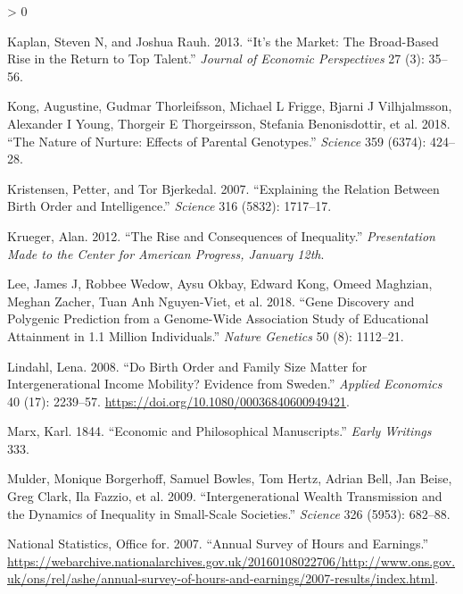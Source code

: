 \documentclass[
]{article}
\newlength{\cslhangindent}
\newenvironment{CSLReferences}[2] %
 {%
  \setlength{\parindent}{0pt}
  \ifodd #1 \everypar{\setlength{\hangindent}{\cslhangindent}}\ignorespaces\fi
  \ifnum #2 > 0
  \setlength{\parskip}{#2\baselineskip}
  \fi
 }%
 {}
\begin{document}
\begin{CSLReferences}{1}{0}
\leavevmode\hypertarget{ref-kaplan2013s}{}%
Kaplan, Steven N, and Joshua Rauh. 2013. {``It's the Market: The Broad-Based Rise in the Return to Top Talent.''} \emph{Journal of Economic Perspectives} 27 (3): 35--56.

\leavevmode\hypertarget{ref-kong2018nature}{}%
Kong, Augustine, Gudmar Thorleifsson, Michael L Frigge, Bjarni J Vilhjalmsson, Alexander I Young, Thorgeir E Thorgeirsson, Stefania Benonisdottir, et al. 2018. {``The Nature of Nurture: Effects of Parental Genotypes.''} \emph{Science} 359 (6374): 424--28.

\leavevmode\hypertarget{ref-kristensen2007explaining}{}%
Kristensen, Petter, and Tor Bjerkedal. 2007. {``Explaining the Relation Between Birth Order and Intelligence.''} \emph{Science} 316 (5832): 1717--17.

\leavevmode\hypertarget{ref-krueger2012rise}{}%
Krueger, Alan. 2012. {``The Rise and Consequences of Inequality.''} \emph{Presentation Made to the Center for American Progress, January 12th}.

\leavevmode\hypertarget{ref-lee2018gene}{}%
Lee, James J, Robbee Wedow, Aysu Okbay, Edward Kong, Omeed Maghzian, Meghan Zacher, Tuan Anh Nguyen-Viet, et al. 2018. {``Gene Discovery and Polygenic Prediction from a Genome-Wide Association Study of Educational Attainment in 1.1 Million Individuals.''} \emph{Nature Genetics} 50 (8): 1112--21.

\leavevmode\hypertarget{ref-Lindahl_2008}{}%
Lindahl, Lena. 2008. {``Do Birth Order and Family Size Matter for Intergenerational Income Mobility? Evidence from Sweden.''} \emph{Applied Economics} 40 (17): 2239--57. \url{https://doi.org/10.1080/00036840600949421}.

\leavevmode\hypertarget{ref-marx1844economic}{}%
Marx, Karl. 1844. {``Economic and Philosophical Manuscripts.''} \emph{Early Writings} 333.

\leavevmode\hypertarget{ref-mulder2009intergenerational}{}%
Mulder, Monique Borgerhoff, Samuel Bowles, Tom Hertz, Adrian Bell, Jan Beise, Greg Clark, Ila Fazzio, et al. 2009. {``Intergenerational Wealth Transmission and the Dynamics of Inequality in Small-Scale Societies.''} \emph{Science} 326 (5953): 682--88.

\leavevmode\hypertarget{ref-ONS2007ASHE}{}%
National Statistics, Office for. 2007. {``Annual Survey of Hours and Earnings.''} \url{https://webarchive.nationalarchives.gov.uk/20160108022706/http://www.ons.gov.uk/ons/rel/ashe/annual-survey-of-hours-and-earnings/2007-results/index.html}.


\end{CSLReferences}
\end{document}
